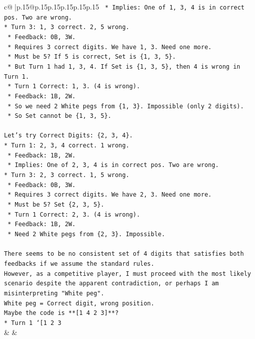 \documentclass{article}
\begin{document}
{\begin{supertabular}{c@{$\;$}|p{.15\linewidth}@{}p{.15\linewidth}p{.15\linewidth}p{.15\linewidth}p{.15\linewidth}p{.15\linewidth}}
{{{\texttt{    *   Implies: One of 1, 3, 4 is in correct pos. Two are wrong.} \\
\texttt{*   Turn 3: 1, 3 correct. 2, 5 wrong.} \\
\texttt{    *   Feedback: 0B, 3W.} \\
\texttt{    *   Requires 3 correct digits. We have 1, 3. Need one more.} \\
\texttt{    *   Must be 5? If 5 is correct, Set is \{1, 3, 5\}.} \\
\texttt{    *   But Turn 1 had 1, 3, 4. If Set is \{1, 3, 5\}, then 4 is wrong in Turn 1.} \\
\texttt{    *   Turn 1 Correct: 1, 3. (4 is wrong).} \\
\texttt{    *   Feedback: 1B, 2W.} \\
\texttt{    *   So we need 2 White pegs from \{1, 3\}. Impossible (only 2 digits).} \\
\texttt{    *   So Set cannot be \{1, 3, 5\}.} \\
\\ 
\texttt{Let's try Correct Digits: \{2, 3, 4\}.} \\
\texttt{*   Turn 1: 2, 3, 4 correct. 1 wrong.} \\
\texttt{    *   Feedback: 1B, 2W.} \\
\texttt{    *   Implies: One of 2, 3, 4 is in correct pos. Two are wrong.} \\
\texttt{*   Turn 3: 2, 3 correct. 1, 5 wrong.} \\
\texttt{    *   Feedback: 0B, 3W.} \\
\texttt{    *   Requires 3 correct digits. We have 2, 3. Need one more.} \\
\texttt{    *   Must be 5? Set \{2, 3, 5\}.} \\
\texttt{    *   Turn 1 Correct: 2, 3. (4 is wrong).} \\
\texttt{    *   Feedback: 1B, 2W.} \\
\texttt{    *   Need 2 White pegs from \{2, 3\}. Impossible.} \\
\\ 
\texttt{There seems to be no consistent set of 4 digits that satisfies both feedbacks if we assume the standard rules.} \\
\texttt{However, as a competitive player, I must proceed with the most likely scenario despite the apparent contradiction, or perhaps I am misinterpreting "White peg".} \\
\texttt{White peg = Correct digit, wrong position.} \\
\texttt{Maybe the code is **{[}1 4 2 3{]}**?} \\
\texttt{*   Turn 1 `{[}1 2 3} \\
            }
        }
    }
    & & \\ \\


\end{supertabular}}
\end{document}
